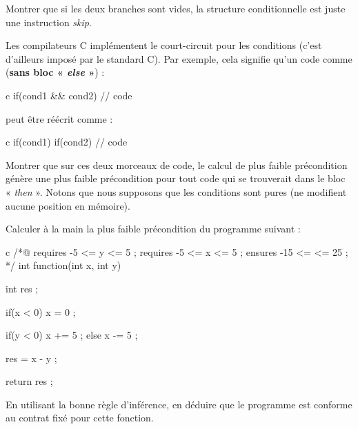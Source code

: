 Montrer que si les deux branches sont vides, la structure conditionnelle est juste une
instruction \textit{skip}.




Les compilateurs C implémentent le court-circuit pour les conditions (c'est d'ailleurs
imposé par le standard C). Par exemple, cela signifie qu'un code comme (\textbf{sans
bloc « \textit{else} »}) :


\begin{CodeBlock}{c}
if(cond1 && cond2){
  // code
}
\end{CodeBlock}


peut être réécrit comme :


\begin{CodeBlock}{c}
if(cond1){
  if(cond2){
    // code
  }
}
\end{CodeBlock}


Montrer que sur ces deux morceaux de code, le calcul de plus faible précondition
génère une plus faible précondition pour tout code qui se trouverait dans le bloc
« \textit{then} ». Notons que nous supposons que les conditions sont pures (ne modifient aucune
position en mémoire).





Calculer à la main la plus faible précondition du programme suivant :


\begin{CodeBlock}{c}
/*@
  requires -5 <= y <= 5 ;
  requires -5 <= x <= 5 ;
  ensures  -15 <= \result <= 25 ;
*/
int function(int x, int y){
  int res ;

  if(x < 0){
    x = 0 ;
  }

  if(y < 0){
    x += 5 ;
  } else {
    x -= 5 ;
  }

  res = x - y ;

  return res ;
}
\end{CodeBlock}



En utilisant la bonne règle d'inférence, en déduire que le programme est
conforme au contrat fixé pour cette fonction.
